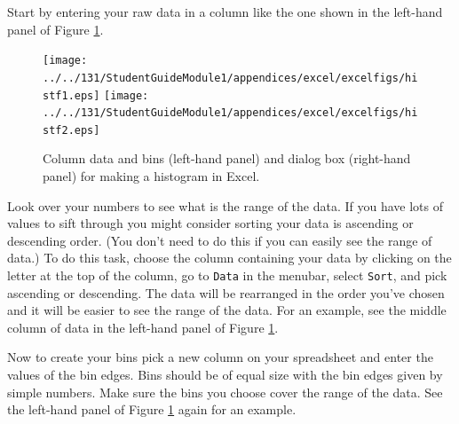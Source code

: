 Start by entering your raw data in a column like the one shown in the left-hand panel of Figure \ref{hist2}.
\begin{figure}[b!]
\begin{center}
\texttt{[image: ../../131/StudentGuideModule1/appendices/excel/excelfigs/histf1.eps]}
\hspace{0.4in}
\texttt{[image: ../../131/StudentGuideModule1/appendices/excel/excelfigs/histf2.eps]}
\caption{Column data and bins (left-hand panel) and dialog box (right-hand panel)  for making a histogram in Excel.}\label{hist2}
\end{center}
\end{figure}
Look over your numbers to see what is the range of the data.
If you have lots of values to sift through you might consider sorting your data is ascending or descending order.
(You don't need to do this if you can easily see the range of data.)
To do this task, choose the column containing your data by clicking on the letter at the top of the column, 
go to {\tt Data} in the menubar, select {\tt Sort}, and pick
ascending or descending.
The data will be rearranged in the order you've chosen and it will be easier to see the range of the data.
For an example, see the middle column of data in the left-hand panel of Figure \ref{hist2}.


Now to create your bins pick a new column on your spreadsheet and enter the values of the bin edges.
Bins should be of equal size with the bin edges given by simple numbers.
Make sure the bins you choose cover the range of the data. 
See the left-hand panel of Figure \ref{hist2} again for an example.

\newpage

